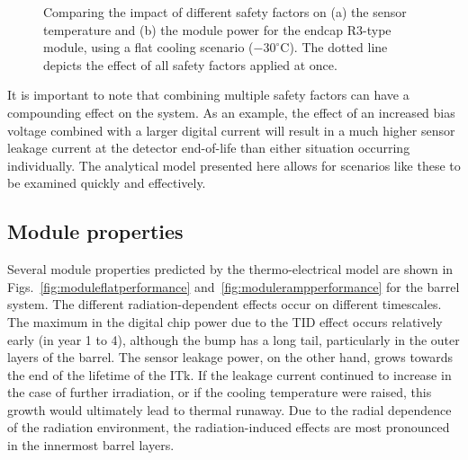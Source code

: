 \begin{figure}[ht]
\centering
{}\quad\quad
{}
\caption{Comparing the impact of different safety factors on (a) the sensor temperature and
(b) the module power for the endcap R3-type module, using a flat cooling scenario ($-30^\circ$C). The dotted line depicts the effect of all safety
factors applied at once.}
\label{fig:safety_factors}
\end{figure}

It is important to note that combining multiple safety factors can have a compounding effect on the system. As an example, the effect of an increased bias voltage combined with a larger digital current will result in a much higher sensor leakage current at the detector end-of-life than either situation occurring individually. The analytical model presented here allows for scenarios like these to be examined quickly and effectively.

\subsection{Module properties}

Several module properties predicted by the thermo-electrical model are shown in Figs.~\ref{fig:moduleflatperformance} and~\ref{fig:modulerampperformance} for the barrel system. The different radiation-dependent effects occur on different timescales. The maximum in the digital chip power due to the TID effect occurs relatively early (in year 1 to 4), although the bump has a long tail, particularly in the outer layers of the barrel. The sensor leakage power, on the other hand, grows towards the end of the lifetime of the ITk. If the leakage current continued to increase in the case of further irradiation, or if the cooling temperature were raised, this growth would ultimately lead to thermal runaway. Due to the radial dependence of the radiation environment, the radiation-induced effects are most pronounced in the innermost barrel layers.

